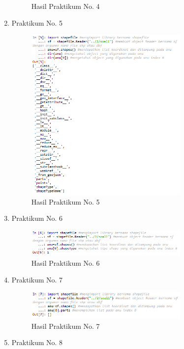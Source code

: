 \begin{enumerate}
\begin{figure}[H]
		\centering
		\caption{Hasil Praktikum No. 4}
	\end{figure}
	\item Praktikum No. 5
	
	\hfill\break
	\begin{figure}[H]
		\includegraphics[width=8cm]{figures/1174006/3/soal5.png}
		\centering
		\caption{Hasil Praktikum No. 5}
	\end{figure}
	\item Praktikum No. 6
	
	\hfill\break
	\begin{figure}[H]
		\includegraphics[width=8cm]{figures/1174006/3/soal6.png}
		\centering
		\caption{Hasil Praktikum No. 6}
	\end{figure}
	\item Praktikum No. 7
	
	\hfill\break
	\begin{figure}[H]
		\includegraphics[width=8cm]{figures/1174006/3/soal7.png}
		\centering
		\caption{Hasil Praktikum No. 7}
	\end{figure}
	\item Praktikum No. 8
	
	\hfill\break
	\begin{figure}[H]

\end{figure}
\end{enumerate}

